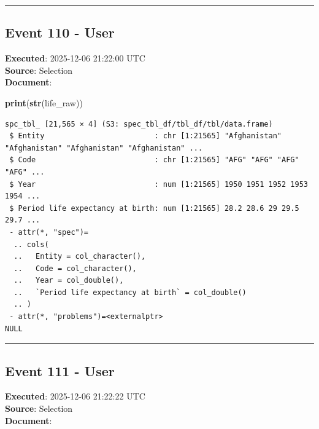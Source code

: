 \documentclass[
  11pt,
]{article}
\newenvironment{Shaded}{\begin{snugshade}}{\end{snugshade}}
\newcommand{\FunctionTok}[1]{\textcolor[rgb]{0.13,0.29,0.53}{\textbf{#1}}}
\newcommand{\NormalTok}[1]{#1}
\newenvironment{rpoutput}{\vspace{0.5em}\begin{snugshade}}{\end{snugshade}}
\begin{document}
\begin{center}\rule{0.5\linewidth}{0.5pt}\end{center}

\subsection{Event 110 - User}\label{event-110---user}

\textbf{Executed}: 2025-12-06 21:22:00 UTC\\
\textbf{Source}: Selection\\
\textbf{Document}:

\begin{Shaded}
\begin{Highlighting}[]
\FunctionTok{print}\NormalTok{(}\FunctionTok{str}\NormalTok{(life\_raw))}
\end{Highlighting}
\end{Shaded}

\begin{rpoutput}

\begin{verbatim}
spc_tbl_ [21,565 × 4] (S3: spec_tbl_df/tbl_df/tbl/data.frame)
 $ Entity                         : chr [1:21565] "Afghanistan" "Afghanistan" "Afghanistan" "Afghanistan" ...
 $ Code                           : chr [1:21565] "AFG" "AFG" "AFG" "AFG" ...
 $ Year                           : num [1:21565] 1950 1951 1952 1953 1954 ...
 $ Period life expectancy at birth: num [1:21565] 28.2 28.6 29 29.5 29.7 ...
 - attr(*, "spec")=
  .. cols(
  ..   Entity = col_character(),
  ..   Code = col_character(),
  ..   Year = col_double(),
  ..   `Period life expectancy at birth` = col_double()
  .. )
 - attr(*, "problems")=<externalptr> 
NULL
\end{verbatim}

\end{rpoutput}

\begin{center}\rule{0.5\linewidth}{0.5pt}\end{center}

\subsection{Event 111 - User}\label{event-111---user}

\textbf{Executed}: 2025-12-06 21:22:22 UTC\\
\textbf{Source}: Selection\\
\textbf{Document}:
\end{document}
